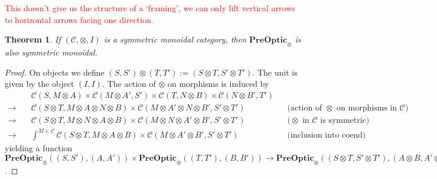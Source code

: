 \documentclass[11pt,a4paper]{article}
\theoremstyle{plain}
\newtheorem{theorem}{Theorem}[section]
\theoremstyle{definition}
\newcommand{\C}{\mathscr{C}}
\newcommand{\PreOptic}{\mathbf{PreOptic}}
\newcommand{\todo}[1]{\textcolor{red}{\small #1}}
\begin{document}
\todo{This doesn't give us the structure of a `framing', we can only lift vertical arrows to horizontal arrows facing one direction.}

\begin{theorem}
If $(\C, \otimes, I)$ is a symmetric monoidal category, then $\PreOptic_\otimes$ is also symmetric monoidal.
\end{theorem}
\begin{proof}
On objects we define $(S, S') \otimes (T, T') := (S \otimes T, S' \otimes T')$. The unit is given by the object $(I, I)$. The action of $\otimes$ on morphisms is induced by
\begin{align*}
&\C(S, M \otimes A) \times \C(M \otimes A', S') \times \C(T, N \otimes B) \times \C(N \otimes B', T')\\
\to \quad&\C(S \otimes T, M \otimes A \otimes N \otimes B) \times \C(M \otimes A' \otimes N \otimes B', S' \otimes T') && \text{(action of $\otimes$ on morphisms in $\C$)}\\
\to \quad&\C(S \otimes T, M \otimes N \otimes A \otimes B) \times \C(M \otimes N \otimes A' \otimes B', S' \otimes T') && \text{($\otimes$ in $\C$ is symmetric)}\\
\to \quad&\int^{M \in \C} \C(S \otimes T, M \otimes A \otimes B) \times \C(M \otimes A' \otimes B', S' \otimes T') && \text{(inclusion into coend)}
\end{align*}
yielding a function $\PreOptic_\otimes((S, S'), (A, A')) \times \PreOptic_\otimes((T, T'), (B, B')) \to \PreOptic_\otimes((S \otimes T, S' \otimes T'), (A \otimes B, A' \otimes B'))$. 


\end{proof}
\end{document}
